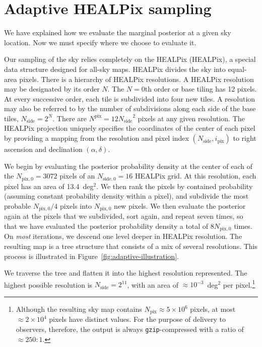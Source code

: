 \documentclass[amsmath,amssymb,aps,prx,reprint,nopreprintnumbers,nofootinbib]{revtex4-1}
\begin{document}
\section{Adaptive HEALPix sampling}
\label{sec:adaptive-sampling}

We have explained how we evaluate the marginal posterior at a given sky location. Now we must specify where we choose to evaluate it.

Our sampling of the sky relies completely on the \acl{HEALPix} (\acs{HEALPix}), a special data structure designed for all\nobreakdashes-sky maps. \ac{HEALPix} divides the sky into equal\nobreakdashes-area pixels. There is a hierarchy of \ac{HEALPix} resolutions. A \ac{HEALPix} resolution may be designated by its order $N$. The $N=0$th order or base tiling has 12 pixels. At every successive order, each tile is subdivided into four new tiles. A resolution may also be referred to by the number of subdivisions along each side of the base tiles, $N_\mathrm{side} = 2^N$. There are $N^\mathrm{pix} = 12 {N_\mathrm{side}}^2$ pixels at any given resolution. The \ac{HEALPix} projection uniquely specifies the coordinates of the center of each pixel by providing a mapping from the resolution and pixel index $(N_\mathrm{side}, i_\mathrm{pix})$ to right ascension and declination $(\alpha, \delta)$.

We begin by evaluating the posterior probability density at the center of each of the $N_{\mathrm{pix},0} = 3072$ pixels of an $N_{\mathrm{side},0}=16$ \ac{HEALPix} grid. At this resolution, each pixel has an area of 13.4~deg$^2$. We then rank the pixels by contained probability (assuming constant probability density within a pixel), and subdivide the most probable $N_{\mathrm{pix},0}/4$ pixels into $N_{\mathrm{pix},0}$ new pixels. We then evaluate the posterior again at the pixels that we subdivided, sort again, and repeat seven times, so that we have evaluated the posterior probability density a total of $8 N_{\mathrm{pix},0}$ times. On \emph{most} iterations, we descend one level deeper in \ac{HEALPix} resolution. The resulting map is a tree structure that consists of a mix of several resolutions. This process is illustrated in Figure~\ref{fig:adaptive-illustration}.

We traverse the tree and flatten it into the highest resolution represented. The highest possible resolution is $N_\mathrm{side}=2^{11}$, with an area of $\approx 10^{-3}$~deg$^2$ per pixel.\footnote{Although the resulting sky map contains $N_\mathrm{pix} \approx 5\times10^6$ pixels, at most $\approx 2\times10^4$ pixels have distinct values. For the purpose of delivery to observers, therefore, the output is always \texttt{gzip}\nobreakdashes-compressed with a ratio of $\approx 250:1$.}
\end{document}
